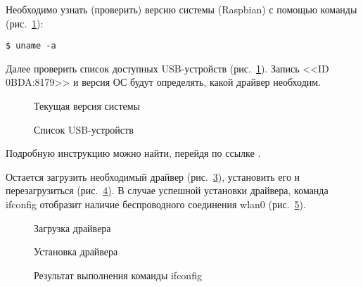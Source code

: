Необходимо узнать (проверить) версию системы (Raspbian) с помощью команды (рис.~\ref{driver_1:driver_1}):

\begin{verbatim}
$ uname -a
\end{verbatim} 
 
Далее проверить список доступных USB-устройств (рис.~\ref{driver_1:driver_1}). Запись <<ID 0BDA:8179>> и версия ОС будут определять, какой драйвер необходим. 

\begin{figure}[h!]
\caption{ Текущая версия системы }
\label{driver_1:driver_1}
\end{figure}


\begin{figure}[h!]
\caption{ Список USB-устройств }
\label{driver_2:driver_2}
\end{figure}

Подробную инструкцию можно найти, перейдя по ссылке \cite{rpi-tp}.

Остается загрузить необходимый драйвер (рис.~\ref{driver_3:driver_3}), установить его и перезагрузиться (рис.~\ref{driver_4:driver_4}). В случае успешной установки драйвера, команда ifconfig отобразит наличие беспроводного соединения wlan0 (рис.~\ref{driver_5:driver_5}).

\begin{figure}[h!]
\caption{ Загрузка драйвера }
\label{driver_3:driver_3}
\end{figure}

\begin{figure}[h!]
\caption{ Установка драйвера }
\label{driver_4:driver_4}
\end{figure}

\begin{figure}[h!]
\caption{ Результат выполнения команды ifconfig }
\label{driver_5:driver_5}
\end{figure}

\clearpage



